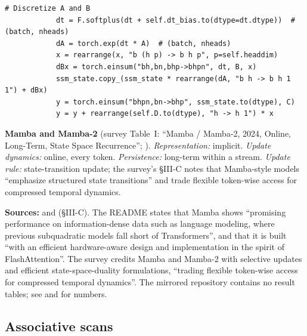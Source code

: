 \begin{lstlisting}[caption={Excerpt from \texttt{repos/\allowbreak state-spaces\_\_mamba/\allowbreak mamba\_ssm/\allowbreak modules/\allowbreak mamba2.py} (method \texttt{Mamba2.step}): one decoding step of Mamba-2. \texttt{dA} is $\alpha_t$, \texttt{dBx} is $(\Delta_t\boldsymbol{x}_t)\boldsymbol{b}_t^{\top}$.},label={lst:c03-mamba2step}]
            # Discretize A and B
            dt = F.softplus(dt + self.dt_bias.to(dtype=dt.dtype))  # (batch, nheads)
            dA = torch.exp(dt * A)  # (batch, nheads)
            x = rearrange(x, "b (h p) -> b h p", p=self.headdim)
            dBx = torch.einsum("bh,bn,bhp->bhpn", dt, B, x)
            ssm_state.copy_(ssm_state * rearrange(dA, "b h -> b h 1 1") + dBx)
            y = torch.einsum("bhpn,bn->bhp", ssm_state.to(dtype), C)
            y = y + rearrange(self.D.to(dtype), "h -> h 1") * x
\end{lstlisting}

\begin{taxonomy}
\textbf{Mamba and Mamba-2} (survey Table~I: ``Mamba / Mamba-2, 2024, Online, Long-Term, State
Space Recurrence''; \citet{zhoubian2026memory}).
\emph{Representation:} implicit. \emph{Update dynamics:} online, every token.
\emph{Persistence:} long-term within a stream. \emph{Update rule:} state-transition update; the
survey's \S III-C notes that Mamba-style models ``emphasize structured state transitions'' and
trade flexible token-wise access for compressed temporal dynamics.
\end{taxonomy}

\begin{results}
\textbf{Sources:}  and \citet{zhoubian2026memory}
(\S III-C). The README states that Mamba shows ``promising performance on information-dense data
such as language modeling, where previous subquadratic models fall short of Transformers'', and
that it is built ``with an efficient hardware-aware design and implementation in the spirit of
FlashAttention''. The survey credits Mamba and Mamba-2 with selective updates and efficient
state-space-duality formulations, ``trading flexible token-wise access for compressed temporal
dynamics''. The mirrored repository contains no result tables; see \citet{gu2023mamba} and
\citet{dao2024ssd} for numbers.
\end{results}

\subsection{Associative scans}\label{sec:c03-scan}

